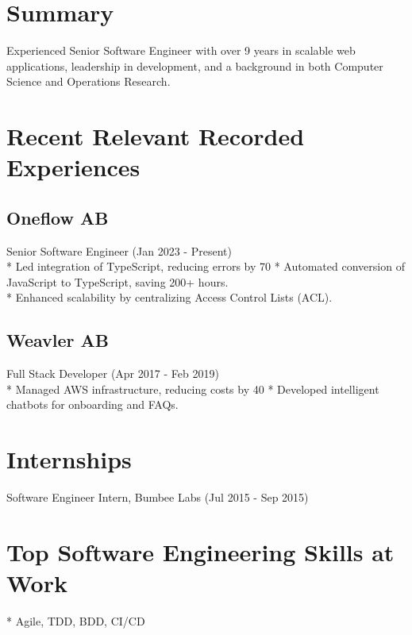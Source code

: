 \documentclass[13pt,a4paper,sans,colorlinks,urlcolor=violet,hyperindex,plainpages=false,bookmarksopen,bookmarksnumbered,pdfusetitle]{moderncv}
\begin{document}
\begin{minipage}[t]{0.65\textwidth} %

  \section{Summary}
  Experienced Senior Software Engineer with over 9 years in scalable web applications, leadership in development, and a background in both Computer Science and Operations Research.

  \vspace{1em}

  \section{Recent Relevant Recorded Experiences}
  \subsection{Oneflow AB}
  Senior Software Engineer (Jan 2023 - Present) \\
  * Led integration of TypeScript, reducing errors by 70%
  * Automated conversion of JavaScript to TypeScript, saving 200+ hours. \\
  * Enhanced scalability by centralizing Access Control Lists (ACL).

  \vspace{0.5em}

  \subsection{Weavler AB}
  Full Stack Developer (Apr 2017 - Feb 2019) \\
  * Managed AWS infrastructure, reducing costs by 40%
  * Developed intelligent chatbots for onboarding and FAQs.

  \section{Internships}
  Software Engineer Intern, Bumbee Labs (Jul 2015 - Sep 2015)

  \section{Top Software Engineering Skills at \textbf{Work}}
  * Agile, TDD, BDD, CI/CD


\end{minipage}
\end{document}
